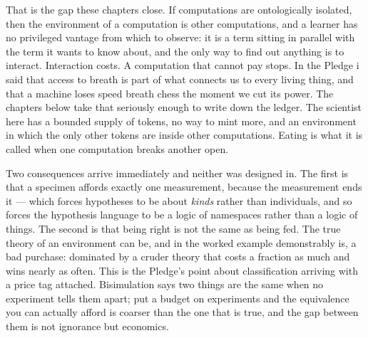 \documentclass[12pt,openright,twoside]{book}
\theoremstyle{remark}
\theoremstyle{plain}
\theoremstyle{remark}
\theoremstyle{plain}
\theoremstyle{plain}
\begin{document}
That is the gap these chapters close.
If computations are ontologically isolated, then the environment of a
computation is other computations, and a learner has no privileged
vantage from which to observe: it is a term sitting in parallel with the
term it wants to know about, and the only way to find out anything is to
interact.
Interaction costs.
A computation that cannot pay stops.
In the Pledge i said that access to breath is part of what connects us to
every living thing, and that a machine loses speed breath chess the moment
we cut its power.
The chapters below take that seriously enough to write down the ledger.
The scientist here has a bounded supply of tokens, no way to mint more, and
an environment in which the only other tokens are inside other
computations.
Eating is what it is called when one computation breaks another open.

Two consequences arrive immediately and neither was designed in.
The first is that a specimen affords exactly one measurement, because the
measurement ends it --- which forces hypotheses to be about \emph{kinds}
rather than individuals, and so forces the hypothesis language to be a
logic of namespaces rather than a logic of things.
The second is that being right is not the same as being fed.
The true theory of an environment can be, and in the worked example
demonstrably is, a bad purchase: dominated by a cruder theory that costs a
fraction as much and wins nearly as often.
This is the Pledge's point about classification arriving with a price tag
attached.
Bisimulation says two things are the same when no experiment tells them
apart; put a budget on experiments and the equivalence you can actually
afford is coarser than the one that is true, and the gap between them is
not ignorance but economics.
\end{document}
